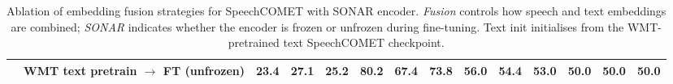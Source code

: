 \begin{table}[t]
\begin{tabular}{ll|rrr|rrr|rrr|rrr}
 & \quad WMT text pretrain $\to$ FT (unfrozen) & \cellcolor[RGB]{189,227,226}23.4 & \cellcolor[RGB]{183,224,223}\textbf{27.1} & \cellcolor[RGB]{187,226,225}25.2 & \cellcolor[RGB]{183,224,223}\textbf{80.2} & \cellcolor[RGB]{255,255,255}67.4 & \cellcolor[RGB]{183,224,223}\textbf{73.8} & \cellcolor[RGB]{250,183,132}\textbf{56.0} & \cellcolor[RGB]{251,196,154}54.4 & \cellcolor[RGB]{250,183,132}\textbf{53.0} & \cellcolor[RGB]{255,255,255}50.0 & \cellcolor[RGB]{255,255,255}50.0 & \cellcolor[RGB]{255,255,255}\textbf{50.0} \\
\bottomrule
\end{tabular}
\caption{Ablation of embedding fusion strategies for SpeechCOMET with SONAR encoder. \emph{Fusion} controls how speech and text embeddings are combined; \emph{SONAR} indicates whether the encoder is frozen or unfrozen during fine-tuning. Text init initialises from the WMT-pretrained text SpeechCOMET checkpoint.}\label{tab:orkney_ablation}
\end{table}
